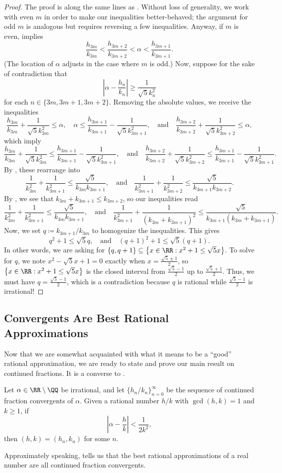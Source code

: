 \documentclass[../notes.tex]{subfiles}
\begin{document}
\begin{proof}
	The proof is along the same lines as . Without loss of generality, we work with even $m$ in order to make our inequalities better-behaved; the argument for odd $m$ is analogous but requires reversing a few inequalities. Anyway, if $m$ is even,  implies
	\[\frac{h_{3m}}{k_{3m}}<\frac{h_{3m+2}}{k_{3m+2}}<\alpha<\frac{h_{3m+1}}{k_{3m+1}}.\]
	(The location of $\alpha$ adjusts in the case where $m$ is odd.) Now, suppose for the sake of contradiction that
	\[\left|\alpha-\frac{h_n}{k_n}\right|\ge\frac1{\sqrt 5k_n^2}\]
	for each $n\in\{3m,3m+1,3m+2\}$. Removing the absolute values, we receive the inequalities
	\[\frac{h_{3m}}{k_{3m}}+\frac1{\sqrt5k_{3m}^2}\le\alpha,\quad\alpha\le\frac{h_{3m+1}}{k_{3m+1}}-\frac1{\sqrt5k_{3m+1}^2},\quad\text{and}\quad\frac{h_{3m+2}}{k_{3m+2}}+\frac1{\sqrt5k_{3m+2}^2}\le\alpha,\]
	which imply
	\[\frac{h_{3m}}{k_{3m}}+\frac1{\sqrt5k_{3m}^2}\le\frac{h_{3m+1}}{k_{3m+1}}-\frac1{\sqrt5k_{3m+1}^2},\quad\text{and}\quad\frac{h_{3m+2}}{k_{3m+2}}+\frac1{\sqrt5k_{3m+2}^2}\le\frac{h_{3m+1}}{k_{3m+1}}-\frac1{\sqrt5k_{3m+1}^2}.\]
	By , these rearrange into
	\[\frac1{k_{3m}^2}+\frac1{k_{3m+1}^2}\le\frac{\sqrt5}{k_{3m}k_{3m+1}},\quad\text{and}\quad\frac1{k_{3m+1}^2}+\frac1{k_{3m+2}^2}\le\frac{\sqrt5}{k_{3m+1}k_{3m+2}}.\]
	By , we see that $k_{3m}+k_{3m+1}\le k_{3m+2}$, so our inequalities read
	\[\frac1{k_{3m}^2}+\frac1{k_{3m+1}^2}\le\frac{\sqrt5}{k_{3m}k_{3m+1}},\quad\text{and}\quad\frac1{k_{3m+1}^2}+\frac1{(k_{3m}+k_{3m+1})^2}\le\frac{\sqrt5}{k_{3m+1}(k_{3m}+k_{3m+1})}.\]
	Now, we set $q\coloneqq k_{3m+1}/k_{3m}$ to homogenize the inequalities. This gives
	\[q^2+1\le\sqrt5q,\quad\text{and}\quad(q+1)^2+1\le\sqrt5(q+1).\]
	In other words, we are asking for $\{q,q+1\}\subseteq\left\{x\in\RR:x^2+1\le\sqrt 5x\right\}$. To solve for $q$, we note $x^2-\sqrt5x+1=0$ exactly when $x=\frac{\sqrt5\pm1}2$, so $\left\{x\in\RR:x^2+1\le\sqrt 5x\right\}$ is the closed interval from $\frac{\sqrt5-1}2$ up to $\frac{\sqrt5+1}2$. Thus, we must have $q=\frac{\sqrt5-1}2$, which is a contradiction because $q$ is rational while $\frac{\sqrt5-1}2$ is irrational!
\end{proof}

\subsection{Convergents Are Best Rational Approximations}
Now that we are somewhat acquainted with what it means to be a ``good'' rational approximation, we are ready to state and prove our main result on continued fractions. It is a converse to .
\begin{theorem} \label{thm:cf-bound}
	Let $\alpha\in\RR\setminus\QQ$ be irrational, and let $\{h_n/k_n\}_{n=0}^\infty$ be the sequence of continued fraction convergents of $\alpha$. Given a rational number $h/k$ with $\gcd(h,k)=1$ and $k\ge1$, if
	\[\left|\alpha-\frac hk\right|<\frac1{2k^2},\]
	then $(h,k)=(h_n,k_n)$ for some $n$.
\end{theorem}
Approximately speaking,  tells us that the best rational approximations of a real number are all continued fraction convergents.
\end{document}
